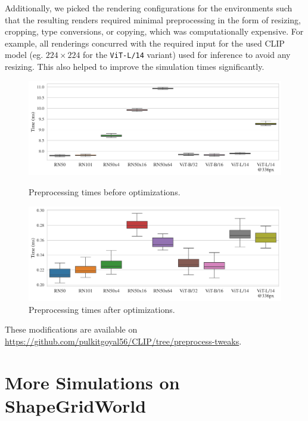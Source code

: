 Additionally, we picked the rendering configurations for the environments such that the resulting renders required minimal preprocessing in the form of resizing, cropping, type conversions, or copying, which was computationally expensive.
For example, all renderings concurred with the required input for the used CLIP model (eg. \(224 \times 224\) for the \texttt{ViT-L/14} variant) used for inference to avoid any resizing.
This also helped to improve the simulation times significantly.\\

\begin{figure}[H]
    \centering
    \includegraphics[width=\textwidth]{images/full_transform.pdf}
    \vspace{-12pt}
    \caption{Preprocessing times before optimizations.}
    \vspace{12pt}
    \includegraphics[width=\textwidth]{images/fast_transform.pdf}
    \vspace{-12pt}
    \caption{Preprocessing times after optimizations.}
    \label{fig:preprocessing-time-improvement}
\end{figure}

These modifications are available on \url{https://github.com/pulkitgoyal56/CLIP/tree/preprocess-tweaks}.



\chapter{More Simulations on ShapeGridWorld}
\label{sec:sgw-semantics-additional}

